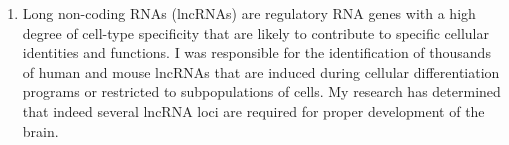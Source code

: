 \documentclass{nihbiosketch}
\begin{document}
\begin{enumerate}









\item Long non-coding RNAs (lncRNAs) are regulatory RNA genes with a high degree of cell-type specificity that are likely to contribute to specific cellular identities and functions. I was responsible for the identification of thousands of human and mouse lncRNAs that are induced during cellular differentiation programs or restricted to subpopulations of cells. My research has determined that indeed several lncRNA loci are required for proper development of the brain.     


\end{enumerate}
\end{document}
